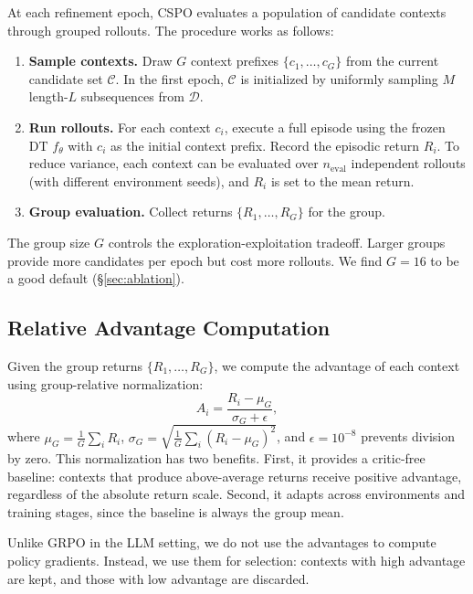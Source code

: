 \documentclass{article}
\newcommand{\cspo}{\textsc{CSPO}}
\newcommand{\cC}{\mathcal{C}}
\newcommand{\cD}{\mathcal{D}}
\begin{document}
At each refinement epoch, \cspo{} evaluates a population of candidate contexts through grouped rollouts. The procedure works as follows:

\begin{enumerate}
    \item \textbf{Sample contexts.} Draw $G$ context prefixes $\{c_1, \ldots, c_G\}$ from the current candidate set $\cC$. In the first epoch, $\cC$ is initialized by uniformly sampling $M$ length-$L$ subsequences from $\cD$.
    \item \textbf{Run rollouts.} For each context $c_i$, execute a full episode using the frozen DT $f_\theta$ with $c_i$ as the initial context prefix. Record the episodic return $R_i$. To reduce variance, each context can be evaluated over $n_{\text{eval}}$ independent rollouts (with different environment seeds), and $R_i$ is set to the mean return.
    \item \textbf{Group evaluation.} Collect returns $\{R_1, \ldots, R_G\}$ for the group.
\end{enumerate}

The group size $G$ controls the exploration-exploitation tradeoff. Larger groups provide more candidates per epoch but cost more rollouts. We find $G = 16$ to be a good default (\S\ref{sec:ablation}).

\subsection{Relative Advantage Computation}
\label{sec:method_advantage}

Given the group returns $\{R_1, \ldots, R_G\}$, we compute the advantage of each context using group-relative normalization:
\begin{equation}
    \label{eq:context_advantage}
    A_i = \frac{R_i - \mu_G}{\sigma_G + \epsilon},
\end{equation}
where $\mu_G = \frac{1}{G}\sum_i R_i$, $\sigma_G = \sqrt{\frac{1}{G}\sum_i (R_i - \mu_G)^2}$, and $\epsilon = 10^{-8}$ prevents division by zero. This normalization has two benefits. First, it provides a critic-free baseline: contexts that produce above-average returns receive positive advantage, regardless of the absolute return scale. Second, it adapts across environments and training stages, since the baseline is always the group mean.

Unlike GRPO in the LLM setting, we do not use the advantages to compute policy gradients. Instead, we use them for selection: contexts with high advantage are kept, and those with low advantage are discarded.
\end{document}
